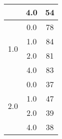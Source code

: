 \begin{longtable}{|c|c|c|c|c|}
    & \multicolumn{2}{c|}{4.0} & \multicolumn{2}{c|}{54} \\
    \hline
    \multirow{4}{*}{1.0} & \multicolumn{2}{c|}{0.0} & \multicolumn{2}{c|}{78} \\
    & \multicolumn{2}{c|}{1.0} & \multicolumn{2}{c|}{84} \\
    & \multicolumn{2}{c|}{2.0} & \multicolumn{2}{c|}{81} \\
    & \multicolumn{2}{c|}{4.0} & \multicolumn{2}{c|}{83} \\
    \hline
    \multirow{4}{*}{2.0} & \multicolumn{2}{c|}{0.0} & \multicolumn{2}{c|}{37} \\
    & \multicolumn{2}{c|}{1.0} & \multicolumn{2}{c|}{47} \\
    & \multicolumn{2}{c|}{2.0} & \multicolumn{2}{c|}{39} \\
    & \multicolumn{2}{c|}{4.0} & \multicolumn{2}{c|}{38} \\
    \hline
    \end{longtable}
    
